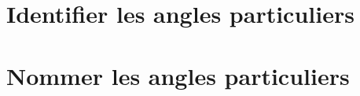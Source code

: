 \documentclass[11pt]{article}
\begin{document}
\section{Identifier les angles particuliers}


\begin{exercice}[1]

\end{exercice}

\newpage

\section{Nommer les angles particuliers}

\begin{exercice}[1]

\end{exercice}
\end{document}
